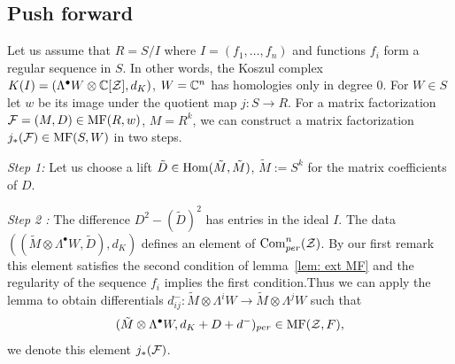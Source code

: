



\subsection{Push forward}\label{ssec: noneq push f}
Let us assume that $R=S/I$ where $I=(f_1,\dots,f_n)$ and functions $f_i$ form a regular sequence in $S$. In other words, the Koszul complex $K(I)=(\Lambda^\bullet W\otimes \mathbb{C}[\mathcal{Z}],d_K)$, $W=\mathbb{C}^n$ has homologies only in degree $0$.
For $W\in S$ let $w$ be its image under the quotient map $j\colon S\rightarrow R$.
For a matrix factorization $\mathcal{F}=(M,D)\in \mathrm{MF}(R,w)$, $M=R^k$, we can construct
a matrix factorization
$j_*(\mathcal{F})\in \mathrm{MF}(S,W)$
in two steps.

{\it Step 1:} Let us choose a lift $\tilde{D}\in \mathop{{\rm Hom}}\nolimits (\tilde{M},\tilde{M})$, $\tilde{M}:=%
S^k$ for the matrix coefficients of $D$.

{\it Step 2 :} The difference $D^2- (\tilde{D})^2$ has entries in the ideal $I$. The data $((\tilde{M}\otimes\Lambda^\bullet W,\tilde{D}),d_K)$ defines an element of $\mathrm{Com}_{per}^n(\mathcal{Z})$.
By our first remark this element satisfies the second condition of lemma~\ref{lem:  ext MF} and the regularity of the sequence $f_i$ implies the first condition.Thus we can apply the lemma to
obtain differentials $d^-_{ij}: \tilde{M}\otimes \Lambda^i W\to \tilde{M}\otimes \Lambda^j W$ such that
$$(\tilde{M}\otimes \Lambda^\bullet W, d_K+D+d^-)_{per}\in \mathrm{MF}(\mathcal{Z},F),$$
we denote this element $j_*(\mathcal{F})$.



